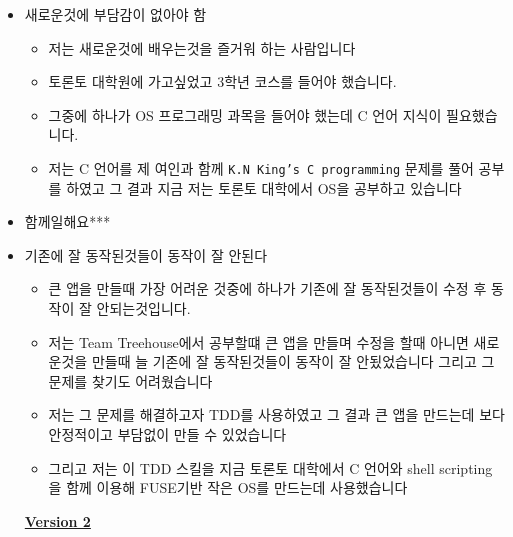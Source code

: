 \documentclass[12pt]{article}
\begin{document}
\begin{itemize}
\begin{itemize}
        \item 새로운것에 부담감이 없아야 함
        \begin{itemize}
            \item 저는 새로운것에 배우는것을 즐거워 하는 사람입니다
            \item 토론토 대학원에 가고싶었고 3학년 코스를 들어야 했습니다.
            \item 그중에 하나가 OS 프로그래밍 과목을 들어야 했는데 C 언어 지식이 필요했습니다.
            \item 저는 C 언어를 제 여인과 함께 \texttt{K.N King's C programming} 문제를 풀어 공부를 하였고 그 결과 지금 저는 토론토 대학에서 OS을 공부하고 있습니다
        \end{itemize}
        \item 함께일해요***

        \item 기존에 잘 동작된것들이 동작이 잘 안된다

        \begin{itemize}
            \item 큰 앱을 만들때 가장 어려운 것중에 하나가 기존에 잘 동작된것들이 수정 후 동작이 잘 안되는것입니다.
            \item 저는 Team Treehouse에서 공부할떄 큰 앱을 만들며 수정을 할때 아니면 새로운것을 만들때 늘 기존에 잘 동작된것들이 동작이 잘 안됬었습니다 그리고 그 문제를 찾기도 어려웠습니다
            \item 저는 그 문제를 해결하고자 TDD를 사용하였고 그 결과 큰 앱을 만드는데 보다 안정적이고 부담없이 만들 수 있었습니다
            \item 그리고 저는 이 TDD 스킬을 지금 토론토 대학에서 C 언어와 shell scripting을 함께 이용해 FUSE기반 작은 OS를 만드는데 사용했습니다
        \end{itemize}

        \bigskip

        \underline{\textbf{Version 2}}

        \bigskip


\end{itemize}
\end{itemize}
\end{document}
